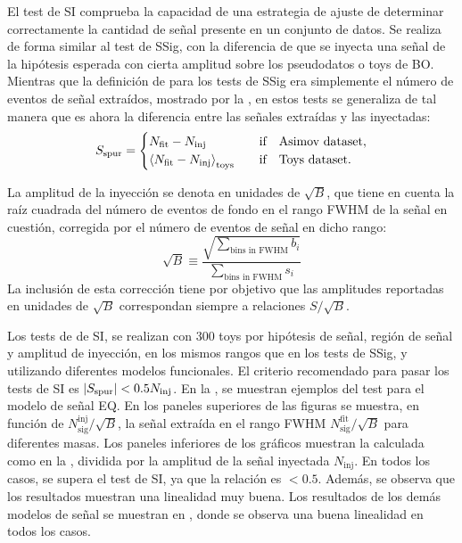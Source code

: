 El test de \acf{SI} comprueba la capacidad de una estrategia de ajuste de determinar correctamente la cantidad de señal presente en un conjunto de datos. Se realiza de forma similar al test de \ac{SSig}, con la diferencia de que se inyecta una señal de la hipótesis esperada con cierta amplitud sobre los pseudodatos o toys de \ac{BO}. Mientras que la definición de \sspur para los tests de \ac{SSig} era simplemente el número de eventos de señal extraídos, mostrado por la \Eqn{\ref{eq:bkg:modeling:sigbkg:sstest:sspur_definition_sstest}}, en estos tests se generaliza de tal manera que \sspur es ahora la diferencia entre las señales extraídas y las inyectadas:
\begin{equation}
    \label{eq:bkg:modeling:sigbkg:sitest:sspur_definition}
    \sspur = 
    \begin{cases}
        N_{\text{fit}} - N_{\text{inj}} & \qif \text{Asimov dataset},\\
        \expval{N_{\text{fit}} - N_{\text{inj}}}_{\text{toys}} & \qif \text{Toys dataset}.
    \end{cases}
\end{equation}

La amplitud de la inyección se denota en unidades de \(\sqrt{B}\), que tiene en cuenta la raíz cuadrada del número de eventos de fondo en el rango \ac{FWHM} de la señal en cuestión, corregida por el número de eventos de señal en dicho rango:
\begin{equation*}
    \sqrt{B} \equiv \frac{
        \displaystyle
        \sqrt{\sum_{\text{bins in FWHM}} b_i}
        }{
        \displaystyle
        \sum_{\text{bins in FWHM}} s_i 
    }
\end{equation*}
La inclusión de esta corrección tiene por objetivo que las amplitudes reportadas en unidades de \(\sqrt{B}\) correspondan siempre a relaciones \(S / \sqrt{B}\).

Los tests de de \ac{SI}, se realizan con 300 toys por hipótesis de señal, región de señal y amplitud de inyección, en los mismos rangos que en los tests de \ac{SSig}, y utilizando diferentes modelos funcionales. El criterio recomendado para pasar los tests de \ac{SI} es \(|S_{\text{spur}}| < 0.5 N_{\text{inj}}\). En la \Fig{\ref{fig:bkg:modeling:sigbkg:sitest:siginj_qstar}}, se muestran ejemplos del test para el modelo de señal \ac{EQ}. En los paneles superiores de las figuras se muestra, en función de \(N_{\text{sig}}^{\text{inj}} / \sqrt{B}\), la señal extraída en el rango \ac{FWHM} \(N_{\text{sig}}^{\text{fit}} / \sqrt{B}\) para diferentes masas. Los paneles inferiores de los gráficos muestran la \sspur calculada como en la \Eqn{\ref{eq:bkg:modeling:sigbkg:sitest:sspur_definition}}, dividida por la amplitud de la señal inyectada \(N_{\text{inj}}\). En todos los casos, se supera el test de \ac{SI}, ya que la relación es \(<0.5\). Además, se observa que los resultados muestran una linealidad muy buena. Los resultados de los demás modelos de señal se muestran en \App{\ref{app:si_results}}, donde se observa una buena linealidad en todos los casos.

